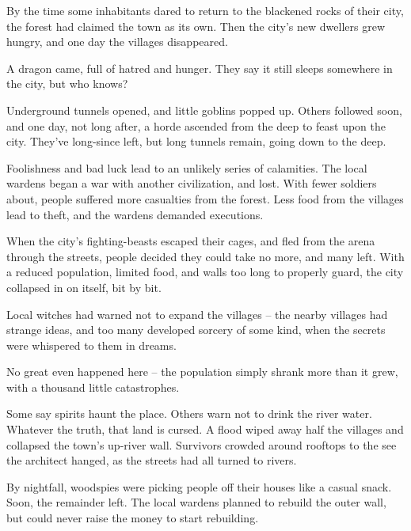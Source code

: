 \begin{multicols}{2}
\begin{dlist}
  By the time some inhabitants dared to return to the blackened rocks of their city, the forest had claimed the town as its own.
  Then the city's new dwellers grew hungry, and one day the \glspl{village} disappeared.
  \item
  A dragon came, full of hatred and hunger.
  They say it still sleeps somewhere in the city, but who knows?
  \item
  Underground tunnels opened, and little goblins popped up.
  Others followed soon, and one day, not long after, a horde ascended from the \gls{deep} to feast upon the city.
  They've long-since left, but long tunnels remain, going down to the \gls{deep}.
  \item
  Foolishness and bad luck lead to an unlikely series of calamities.
  The local \glspl{warden} began a war with another civilization, and lost.
  With fewer soldiers about, people suffered more casualties from the forest.
  Less food from the \glspl{village} lead to theft, and the \glspl{warden} demanded executions.

  When the city's fighting-beasts escaped their cages, and fled from the arena through the streets, people decided they could take no more, and many left.
  With a reduced population, limited food, and walls too long to properly guard, the city collapsed in on itself, bit by bit.
  \item
  \ifodd\value{r4}
    Local witches had warned not to expand the \glspl{village} -- the nearby \glspl{village} had strange ideas, and too many developed sorcery of some kind, when the secrets were whispered to them in dreams.

    No great even happened here -- the population simply shrank more than it grew, with a thousand little catastrophes.

    Some say spirits haunt the place.
    Others warn not to drink the river water.
    Whatever the truth, that land is cursed.
  \else
    A flood wiped away half the \glspl{village} and collapsed the town's up-river wall.
    Survivors crowded around rooftops to the see the architect hanged, as the streets had all turned to rivers.

    By nightfall, woodspies were picking people off their houses like a casual snack.
    Soon, the remainder left.
    The local \glspl{warden} planned to rebuild the outer wall, but could never raise the money to start rebuilding.
  \fi
\end{dlist}



\end{multicols}
